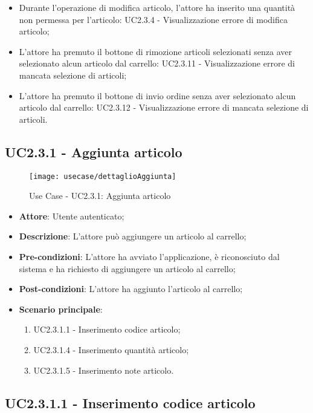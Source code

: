 \begin{itemize}
\begin{itemize}
			\item Durante l'operazione di modifica articolo, l'attore ha inserito una quantità non permessa per l'articolo: UC2.3.4 - Visualizzazione errore di modifica articolo;
			\item L'attore ha premuto il bottone di rimozione articoli selezionati senza aver selezionato alcun articolo dal carrello: UC2.3.11 - Visualizzazione errore di mancata selezione di articoli;
			\item L'attore ha premuto il bottone di invio ordine senza aver selezionato alcun articolo dal carrello: UC2.3.12 - Visualizzazione errore di mancata selezione di articoli.
		\end{itemize}
\end{itemize}

\newpage

\subsection{UC2.3.1 - Aggiunta articolo}

\begin{figure}[!h] 
    \centering 
    \texttt{[image: usecase/dettaglioAggiunta]} 
    \caption{Use Case - UC2.3.1: Aggiunta articolo}
\end{figure}

\begin{itemize}
	\item \textbf{Attore}: Utente autenticato;
	\item \textbf{Descrizione}: L'attore può aggiungere un articolo al carrello;
	\item \textbf{Pre-condizioni}: L'attore ha avviato l'applicazione, è riconosciuto dal sistema e ha richiesto di aggiungere un articolo al carrello;
	\item \textbf{Post-condizioni}: L'attore ha aggiunto l'articolo al carrello;
	\item \textbf{Scenario principale}:
		\begin{enumerate}
			\item UC2.3.1.1 - Inserimento codice articolo;
			\item UC2.3.1.4 - Inserimento quantità articolo;
			\item UC2.3.1.5 - Inserimento note articolo.
		\end{enumerate}
\end{itemize}

\subsection{UC2.3.1.1 - Inserimento codice articolo}

